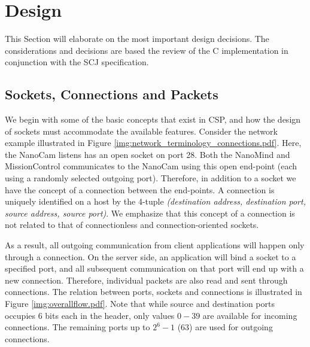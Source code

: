\section{Design}
This Section will elaborate on the most important design decisions. The considerations and decisions are based the review of the C implementation in conjunction with the SCJ specification.

\subsection{Sockets, Connections and Packets}
We begin with some of the basic concepts that exist in CSP, and how the design of sockets must accommodate the available features. Consider the network example illustrated in Figure \ref{img:network_terminology_connections.pdf}. Here, the NanoCam listens has an open socket on port 28. Both the NanoMind and MissionControl communicates to the NanoCam using this open end-point (each using a randomly selected outgoing port). Therefore, in addition to a socket we have the concept of a connection between the end-points. A connection is uniquely identified on a host by the 4-tuple \textit{(destination address, destination port, source address, source port)}. We emphasize that this concept of a connection is not related to that of connectionless and connection-oriented sockets.

As a result, all outgoing communication from client applications will happen only through a connection. On the server side, an application will bind a socket to a specified port, and all subsequent communication on that port will end up with a new connection. Therefore, individual packets are also read and sent through connections. The relation between ports, sockets and connections is illustrated in Figure \ref{img:overallflow.pdf}. Note that while source and destination ports occupies 6 bits each in the header, only values $0-39$ are available for incoming connections. The remaining ports up to $2^6-1$ (63) are used for outgoing connections.

